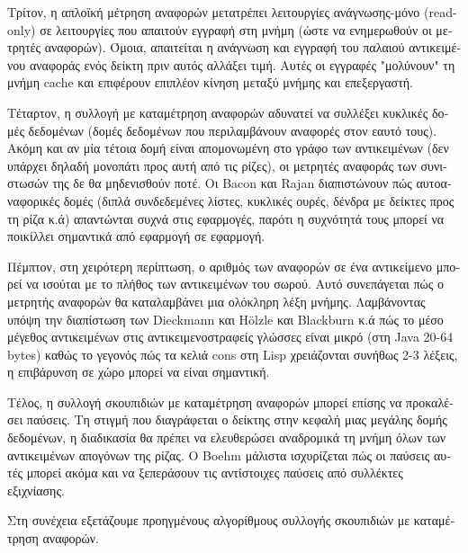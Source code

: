 \begin{greek}
Τρίτον, η απλοϊκή μέτρηση αναφορών μετατρέπει λειτουργίες
ανάγνωσης-μόνο (read-only) σε λειτουργίες που απαιτούν εγγραφή
στη μνήμη (ώστε να ενημερωθούν οι μετρητές αναφορών). Όμοια,
απαιτείται η ανάγνωση και εγγραφή του παλαιού αντικειμένου
αναφοράς ενός δείκτη πριν αυτός αλλάξει τιμή. Αυτές οι εγγραφές
"μολύνουν" τη μνήμη cache και επιφέρουν επιπλέον κίνηση μεταξύ
μνήμης και επεξεργαστή.

Τέταρτον, η συλλογή με καταμέτρηση αναφορών αδυνατεί να συλλέξει
κυκλικές δομές δεδομένων (δομές δεδομένων που περιλαμβάνουν
αναφορές στον εαυτό τους). Ακόμη και αν μία τέτοια δομή είναι
απομονωμένη στο γράφο των αντικειμένων (δεν υπάρχει δηλαδή
μονοπάτι προς αυτή από τις ρίζες), οι μετρητές αναφοράς των
συνιστωσών της δε θα μηδενισθούν ποτέ. Οι Bacon και Rajan
\cite{DBLP:conf/ecoop/BaconR01} διαπιστώνουν πώς αυτοαναφορικές
δομές (διπλά συνδεδεμένες λίστες, κυκλικές ουρές, δένδρα με
δείκτες προς τη ρίζα κ.ά) απαντώνται συχνά στις εφαρμογές,
παρότι η συχνότητά τους μπορεί να ποικίλλει σημαντικά από
εφαρμογή σε εφαρμογή.

Πέμπτον, στη χειρότερη περίπτωση, ο αριθμός των αναφορών σε
ένα αντικείμενο μπορεί να ισούται με το πλήθος των αντικειμένων
του σωρού. Αυτό συνεπάγεται πώς ο μετρητής αναφορών θα
καταλαμβάνει μια ολόκληρη λέξη μνήμης. Λαμβάνοντας υπόψη την
διαπίστωση των Dieckmann και H{\"o}lzle
\cite{DBLP:conf/ecoop/DieckmannH99} και Blackburn
κ.ά \cite{DBLP:conf/oopsla/BlackburnGHKMBDFFGHHJLMPSVDW06}
πώς το μέσο μέγεθος αντικειμένων στις αντικειμενοστραφείς
γλώσσες είναι μικρό (στη Java 20-64 bytes) καθώς το γεγονός
πώς τα κελιά cons στη Lisp χρειάζονται συνήθως 2-3 λέξεις,
η επιβάρυνση σε χώρο μπορεί να είναι σημαντική.

Τέλος, η συλλογή σκουπιδιών με καταμέτρηση αναφορών μπορεί
επίσης να προκαλέσει παύσεις. Τη στιγμή που διαγράφεται ο
δείκτης στην κεφαλή μιας μεγάλης δομής δεδομένων, η διαδικασία 
 θα πρέπει να ελευθερώσει αναδρομικά
τη μνήμη όλων των αντικειμένων απογόνων της ρίζας. Ο Boehm
\cite{DBLP:conf/popl/Boehm04} μάλιστα ισχυρίζεται πώς οι
παύσεις αυτές μπορεί ακόμα και να ξεπεράσουν τις αντίστοιχες
παύσεις από συλλέκτες εξιχνίασης.

Στη συνέχεια εξετάζουμε προηγμένους αλγορίθμους συλλογής
σκουπιδιών με καταμέτρηση αναφορών.


\end{greek}
